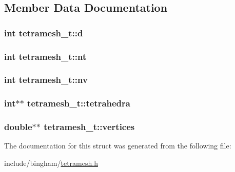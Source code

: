 \subsection{Member Data Documentation}
\hypertarget{structtetramesh__t_a8a5f93d3d854d48d94261d7771e0308f}{
\subsubsection[{d}]{\setlength{\rightskip}{0pt plus 5cm}int {\bf tetramesh\_\-t::d}}}
\label{structtetramesh__t_a8a5f93d3d854d48d94261d7771e0308f}
\hypertarget{structtetramesh__t_abf103dd6de6a71c461af3d37d46acc05}{
\subsubsection[{nt}]{\setlength{\rightskip}{0pt plus 5cm}int {\bf tetramesh\_\-t::nt}}}
\label{structtetramesh__t_abf103dd6de6a71c461af3d37d46acc05}
\hypertarget{structtetramesh__t_a44c48045e28f4ffc611adabd3fa57279}{
\subsubsection[{nv}]{\setlength{\rightskip}{0pt plus 5cm}int {\bf tetramesh\_\-t::nv}}}
\label{structtetramesh__t_a44c48045e28f4ffc611adabd3fa57279}
\hypertarget{structtetramesh__t_a83e3bc639cdc60ab92d90615bcff647b}{
\subsubsection[{tetrahedra}]{\setlength{\rightskip}{0pt plus 5cm}int$\ast$$\ast$ {\bf tetramesh\_\-t::tetrahedra}}}
\label{structtetramesh__t_a83e3bc639cdc60ab92d90615bcff647b}
\hypertarget{structtetramesh__t_a2cd2d17e8889a5a63b43eb223a81cb02}{
\subsubsection[{vertices}]{\setlength{\rightskip}{0pt plus 5cm}double$\ast$$\ast$ {\bf tetramesh\_\-t::vertices}}}
\label{structtetramesh__t_a2cd2d17e8889a5a63b43eb223a81cb02}


The documentation for this struct was generated from the following file:\begin{DoxyCompactItemize}
\item 
include/bingham/\hyperlink{tetramesh_8h}{tetramesh.h}\end{DoxyCompactItemize}
